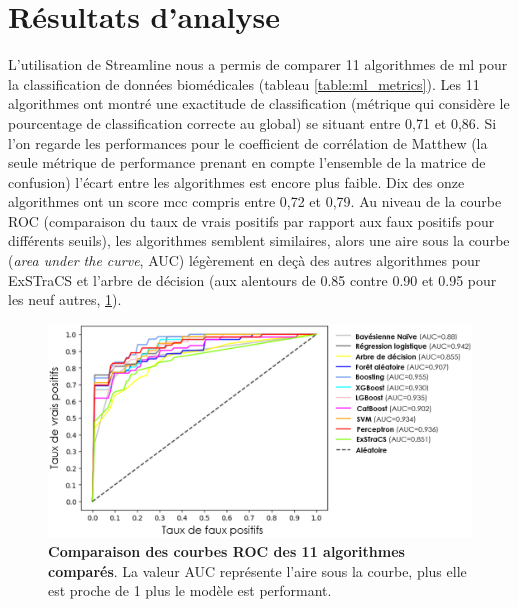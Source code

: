 \section{Résultats d'analyse}
L'utilisation de Streamline nous a permis de comparer 11 algorithmes de \gls{ml} pour la classification de données biomédicales (tableau \ref{table:ml_metrics}). Les 11 algorithmes ont montré une exactitude de classification (métrique qui considère le pourcentage de classification correcte au global) se situant entre 0,71 et 0,86. Si l’on regarde les performances pour le coefficient de corrélation de Matthew (la seule métrique de performance prenant en compte l'ensemble de la matrice de confusion) l'écart entre les algorithmes est encore plus faible. Dix des onze algorithmes ont un score \gls{mcc} compris entre 0,72 et 0,79. Au niveau de la courbe ROC (comparaison du taux de vrais positifs par rapport aux faux positifs pour différents seuils), les algorithmes semblent similaires, alors une aire sous la courbe (\textit{area under the curve}, AUC) légèrement en deçà des autres algorithmes pour ExSTraCS et l'arbre de décision (aux alentours de 0.85 contre 0.90 et 0.95 pour les neuf autres, \ref{fig:roc_curve}).
\begin{figure}[!ht]
  \centering
  \includegraphics[width=1\textwidth]{figures/roc_streamline.png}
  \caption[Comparaison des courbes ROC]{\textbf{Comparaison des courbes ROC des 11 algorithmes comparés}. La valeur AUC représente l'aire sous la courbe, plus elle est proche de 1 plus le modèle est performant.}
  \label{fig:roc_curve}
\end{figure}
